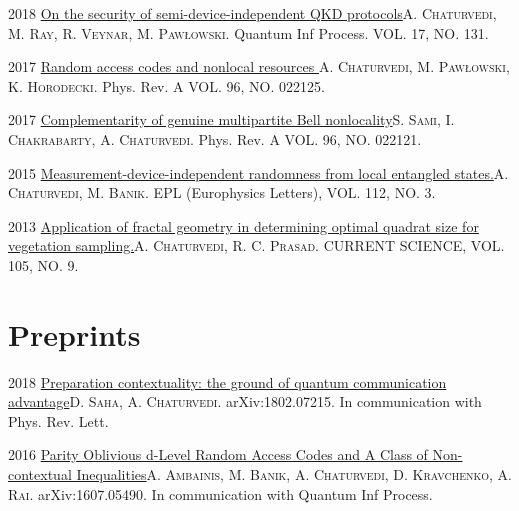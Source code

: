 \documentclass{tccv}
\begin{document}
\begin{yearlist}
\item{2018}
{\href{https://link.springer.com/article/10.1007/s11128-018-1892-z}{On the security of semi-device-independent QKD protocols}}{\textsc{A. Chaturvedi, M. Ray, R. Veynar, M. Paw{\l}owski.} Quantum Inf Process. VOL. 17, NO. 131.}

\item{2017}
{\href{https://journals.aps.org/pra/abstract/10.1103/PhysRevA.96.022125}{Random access codes and nonlocal resources
}}{\textsc{A. Chaturvedi, M. Paw{\l}owski, K. Horodecki.} Phys. Rev. A VOL. 96, NO. 022125.}

\item{2017}
{\href{https://journals.aps.org/pra/abstract/10.1103/PhysRevA.96.022121}{Complementarity of genuine multipartite Bell nonlocality}}{\textsc{S. Sami, I. Chakrabarty, A. Chaturvedi.} Phys. Rev. A VOL. 96, NO. 022121.}
\item{2015}
{\href{http://iopscience.iop.org/article/10.1209/0295-5075/112/30003}{Measurement-device-independent randomness from local entangled states.}}{\textsc{A. Chaturvedi, M. Banik.}  EPL (Europhysics Letters), VOL. 112, NO. 3.}

\item{2013}
{\href{http://www.currentscience.ac.in/Volumes/105/09/1275.pdf}{Application of fractal geometry in determining optimal quadrat size for vegetation sampling.}}{\textsc{A. Chaturvedi, R. C. Prasad.}  CURRENT SCIENCE, VOL. 105, NO. 9.}


\end{yearlist}

\section{Preprints}

\begin{yearlist}
     
\item{2018}
{\href{https://arxiv.org/abs/1802.07215}{Preparation contextuality: the ground of quantum communication advantage}}{\textsc{D. Saha, A. Chaturvedi.} arXiv:1802.07215. In communication with Phys. Rev. Lett.}

\item{2016}
{\href{http://arxiv.org/abs/1603.09120}{ Parity Oblivious d-Level Random Access Codes and A Class of Non-contextual Inequalities}}{\textsc{A. Ambainis, M. Banik, A. Chaturvedi, D. Kravchenko, A. Rai.} arXiv:1607.05490. In communication with Quantum Inf Process. }

\end{yearlist}
\end{document}
